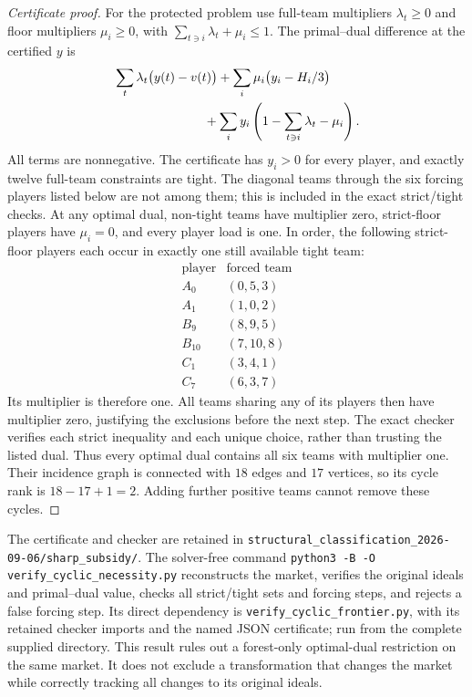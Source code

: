 \begin{proof}[Certificate proof]
For the protected problem use full-team multipliers $\lambda_t\ge0$
and floor multipliers $\mu_i\ge0$, with
$\sum_{t\ni i}\lambda_t+\mu_i\le1$. The primal--dual difference
at the certified $y$ is
\begin{align*}
 &\sum_t\lambda_t\bigl(y(t)-v(t)\bigr)
 +\sum_i\mu_i\bigl(y_i-H_i/3\bigr)\\
 &\hspace{25mm}+\sum_i y_i
                  \left(1-\sum_{t\ni i}\lambda_t-\mu_i\right).
\end{align*}
All terms are nonnegative. The certificate has $y_i>0$ for every
player, and exactly twelve full-team constraints are tight. The diagonal
teams through the six forcing players listed below are not among them;
this is included in the exact strict/tight checks. At any
optimal dual, non-tight teams have multiplier zero, strict-floor
players have $\mu_i=0$, and every player load is one. In order, the
following strict-floor players each occur in exactly one still
available tight team:
\[
\begin{array}{c|c}
 \text{player}&\text{forced team}\\ \hline
 A_0&(0,5,3)\\
 A_1&(1,0,2)\\
 B_9&(8,9,5)\\
 B_{10}&(7,10,8)\\
 C_1&(3,4,1)\\
 C_7&(6,3,7)
\end{array}
\]
Its multiplier is therefore one. All teams sharing any of its players
then have multiplier zero, justifying the exclusions before the next
step. The exact checker verifies each strict inequality and each unique
choice, rather than trusting the listed dual. Thus every optimal dual
contains all six teams with multiplier one. Their incidence graph is
connected with $18$ edges and $17$ vertices, so its cycle rank is
$18-17+1=2$. Adding further positive teams cannot remove these cycles.
\end{proof}
The certificate and checker are retained in
\nolinkurl{structural_classification_2026-09-06/sharp_subsidy/}.
The solver-free command
\texttt{python3 -B -O verify\_cyclic\_necessity.py}
reconstructs the market, verifies the original ideals and primal--dual
value, checks all strict/tight sets and forcing steps, and rejects a
false forcing step. Its direct dependency is
\texttt{verify\_cyclic\_frontier.py}, with its retained checker imports
and the named JSON certificate; run from the complete supplied directory.
This result rules out a forest-only optimal-dual restriction on the
same market. It does not exclude a transformation that changes the
market while correctly tracking all changes to its original ideals.

